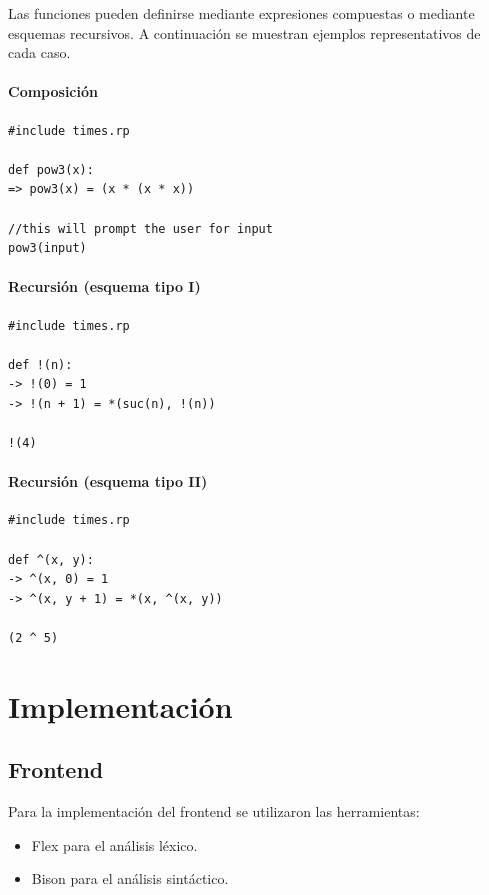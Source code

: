 \documentclass{article}
\begin{document}
Las funciones pueden definirse mediante expresiones compuestas o mediante esquemas recursivos. A continuación se muestran ejemplos representativos de cada caso.

\paragraph{Composición}

\label{code:composition}
\begin{verbatim}
#include times.rp

def pow3(x):
=> pow3(x) = (x * (x * x))

//this will prompt the user for input
pow3(input)
\end{verbatim}

\paragraph{Recursión (esquema tipo I)}

\begin{verbatim}
#include times.rp

def !(n):
-> !(0) = 1
-> !(n + 1) = *(suc(n), !(n))

!(4)
\end{verbatim}

\paragraph{Recursión (esquema tipo II)}

\label{code:recursive}
\begin{verbatim}
#include times.rp

def ^(x, y):
-> ^(x, 0) = 1
-> ^(x, y + 1) = *(x, ^(x, y))

(2 ^ 5)
\end{verbatim}

\section {Implementación}

\subsection {Frontend}

Para la implementación del frontend se utilizaron las herramientas:
\begin{itemize}
\item Flex para el análisis léxico.
\item Bison para el análisis sintáctico.
\end{itemize}
\end{document}
